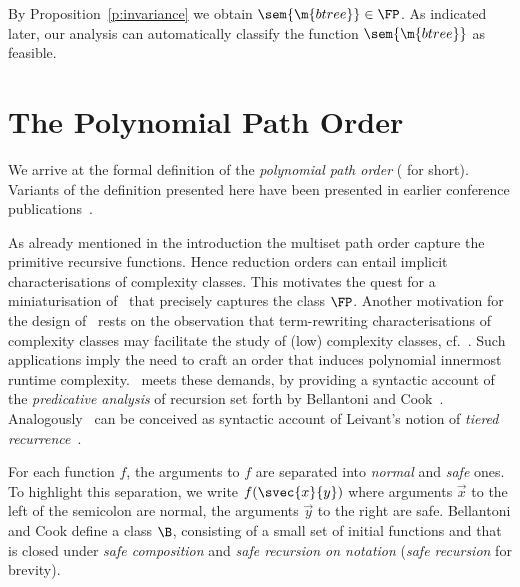 \documentclass{LMCS}
\begin{document}
By Proposition~\ref{p:invariance} we obtain $\sem{\m{btree}} \in \FP$.
As indicated later, our analysis can automatically classify the function $\sem{\m{btree}}$ as feasible.




\section{The Polynomial Path Order}\label{s:popstar}

We arrive at the formal definition of the \emph{polynomial path order}
(\emph{\POPSTAR} for short). Variants of the definition presented here have been 
presented in earlier conference publications~\cite{AM08,AMS08,AM09,AM09b}. 

As already mentioned in the introduction 
the multiset path order capture the primitive recursive functions.
Hence reduction orders can entail implicit characterisations of
complexity classes. This motivates the quest for a miniaturisation of \MPO\ that
precisely captures the class $\FP$. 
Another motivation for the design of \POPSTAR\ rests on
the observation that term-rewriting characterisations of complexity classes 
may facilitate the study of (low) complexity classes, cf.~\cite{BW96,CW97}. 
Such applications imply the need to craft an order that
induces polynomial innermost runtime complexity.
\POPSTAR\ meets these demands, by providing a syntactic account of the
\emph{predicative analysis} of recursion set forth by Bellantoni and Cook~\cite{BC92}. 
Analogously \POPSTAR\ can be conceived as syntactic account of Leivant's 
notion of \emph{tiered recurrence}~\cite{Leivant:1990,Leivant93}.

For each function $f$, the arguments to $f$ are separated into \emph{normal} 
and \emph{safe} ones.
To highlight this separation, we write $f(\svec{x}{y})$ where arguments $\vec{x}$ to the left 
of the semicolon are normal, the arguments $\vec{y}$ to the right are safe.
Bellantoni and Cook define a class $\B$,
consisting of a small set of initial functions 
and that is closed under \emph{safe composition} and \emph{safe recursion on notation} (\emph{safe recursion} for brevity).
\end{document}
